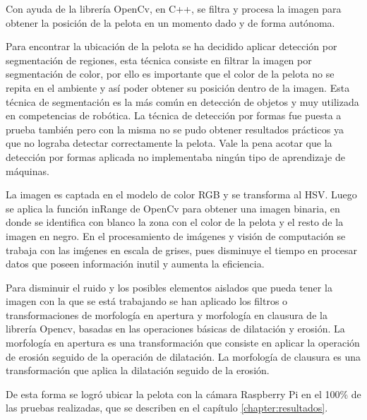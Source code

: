 Con ayuda de la librería OpenCv, en \gls{C++}, se filtra y procesa la imagen para obtener la posición de la pelota en un momento dado y de forma autónoma. 

Para encontrar la ubicación de la pelota  se ha decidido aplicar detección por segmentación de regiones, esta técnica consiste en filtrar la imagen por segmentaci\'on de color, por ello es importante que el color de la pelota no se repita en el ambiente y así poder obtener su posición dentro de la imagen. Esta t\'ecnica de segmentaci\'on es la m\'as com\'un en detecci\'on de objetos y muy utilizada en competencias de rob\'otica. La t\'ecnica de detecci\'on por  formas fue puesta a prueba tambi\'en pero con la misma no se pudo obtener resultados pr\'acticos ya que no lograba detectar correctamente la pelota. Vale la pena acotar que la detecci\'on por formas aplicada no implementaba ning\'un tipo de aprendizaje de m\'aquinas.

La imagen es captada en el modelo de color \gls{RGB} y se transforma al \gls{HSV}. Luego se aplica la función inRange de OpenCv para obtener una imagen binaria, en donde se identifica con blanco la zona con el color de la pelota y el resto de la imagen en negro. En el procesamiento de im\'agenes y visi\'on de computaci\'on se trabaja con las im\'genes en escala de grises, pues disminuye el tiempo en procesar datos que poseen informaci\'on inutil y aumenta la eficiencia.

Para disminuir el ruido y los posibles elementos aislados que pueda tener la imagen con la que se está trabajando se han aplicado los filtros o transformaciones de morfología en apertura y morfología en clausura de la librería Opencv, basadas en las operaciones básicas de dilatación y erosión. La morfología en apertura es una transformación que consiste en aplicar la operación de erosión seguido de la operación de dilatación. La morfología de clausura es una transformación que aplica la dilatación seguido de la erosión.

De esta forma se logró ubicar la pelota con la cámara Raspberry Pi en el 100\% de las pruebas realizadas, que se describen en el cap\'itulo \ref{chapter:resultados}.


